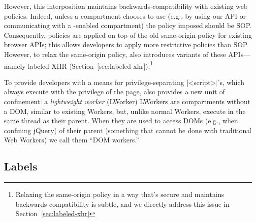 However, this interposition maintains backwards-compatibility with
existing web policies.
%
Indeed, unless a compartment chooses to use \sys{} (e.g., by using our
API or communicating with a \sys{}-enabled compartment) the policy
imposed should be SOP.
%
Consequently, \sys{} policies are applied on top of the old
same-origin policy for existing browser APIs; this allows developers
to apply more restrictive policies than SOP\@.
%
However, to relax the same-origin policy, \sys{} also introduces
variants of these APIs---namely labeled XHR
(Section~\ref{sec:labeled-xhr}).\footnote{Relaxing the same-origin
  policy in a way that's secure and maintains backwards-compatibility
  is subtle, and we directly address this issue in
Section~\ref{sec:labeled-xhr}}

To provide developers with a means for privilege-separating
\js|<script>|'s, which always execute with the privilege of the page,
\sys{} also provides a new unit of confinement: a \emph{lightweight worker}
(LWorker)
%
LWorkers are compartments without a DOM, similar to existing Workers,
but, unlike normal Workers, execute in the same thread as their
parent.
%
When they are used to access DOMs (e.g., when confining jQuery) of
their parent (something that cannot be done with traditional Web
Workers) we call them ``DOM workers.''


\subsection{Labels}
\label{sec:labels}

